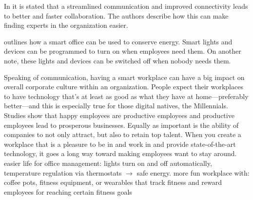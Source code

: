 In \cite{hbcommunications} it is stated that a streamlined communication and improved connectivity leads to better and faster collaboration. The authors describe how this can make finding experts in the organization easier.


\cite{hbcommunications} outlines how a smart office can be used to conserve energy. Smart lights and devices can be programmed to turn on when employees need them. On another note, these lights and devices can be switched off when nobody needs them.

Speaking of communication, having a smart workplace can have a big impact on overall corporate culture within an organization. People expect their workplaces to have technology that’s at least as good as what they have at home—preferably better—and this is especially true for those digital natives, the Millennials. Studies show that happy employees are productive employees and productive employees lead to prosperous businesses. Equally as important is the ability of companies to not only attract, but also to retain top talent. When you create a workplace that is a pleasure to be in and work in and provide state-of-the-art technology, it goes a long way toward making employees want to stay around. easier life for office management: lights turn on and off automatically, temperature regulation via thermostats \(\rightarrow\) safe energy. more fun workplace with: coffee pots, fitness equipment, or wearables that track fitness and reward employees for
reaching certain fitness goals\cite{hbcommunications}

